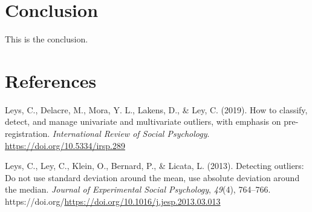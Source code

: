 \documentclass[
]{article}
\newlength{\cslhangindent}
\newlength{\cslentryspacingunit} %
\newenvironment{CSLReferences}[2] %
 {%
  \setlength{\parindent}{0pt}
  \ifodd #1
  \let\oldpar\par
  \def\par{\hangindent=\cslhangindent\oldpar}
  \fi
  \setlength{\parskip}{#2\cslentryspacingunit}
 }%
 {}
\begin{document}
\hypertarget{conclusion}{%
\section{Conclusion}\label{conclusion}}

This is the conclusion.

\hypertarget{references}{%
\section*{References}\label{references}}

\hypertarget{refs}{}
\begin{CSLReferences}{1}{0}
\leavevmode{}%
Leys, C., Delacre, M., Mora, Y. L., Lakens, D., \& Ley, C. (2019). How
to classify, detect, and manage univariate and multivariate outliers,
with emphasis on pre-registration. \emph{International Review of Social
Psychology}. \url{https://doi.org/10.5334/irsp.289}

\leavevmode{}%
Leys, C., Ley, C., Klein, O., Bernard, P., \& Licata, L. (2013).
Detecting outliers: Do not use standard deviation around the mean, use
absolute deviation around the median. \emph{Journal of Experimental
Social Psychology}, \emph{49}(4), 764--766.
https://doi.org/\url{https://doi.org/10.1016/j.jesp.2013.03.013}

\end{CSLReferences}
\end{document}
